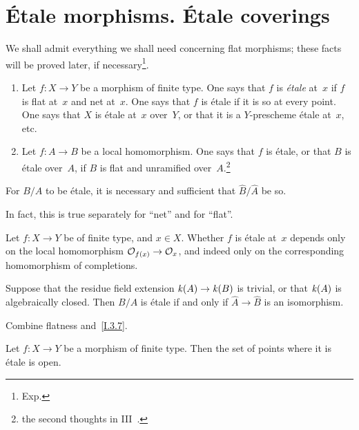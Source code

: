 \section{\'Etale morphisms. \'Etale coverings}
\label{I.4}

We shall admit everything we shall need concerning flat morphisms;
these facts will be proved later, if necessary\footnote{\Cf
Exp\ptbl{}.}.

\begin{definition}
\label{I.4.1}
\begin{enumerate}
\item[a)] Let $f\colon X\to Y$ be a morphism of finite type.
One says that $f$ is \emph{\'etale} at~$x$ if $f$ is flat at~$x$
and net at~$x$. One says that $f$ is \'etale if it is so at every
point. One says that $X$ is \'etale at~$x$ over~$Y$, or that it
is a $Y$-prescheme \'etale at~$x$, etc.
\item[b)] Let $f\colon A\to B$ be a local homomorphism. One says
that $f$ is \'etale, or that $B$ is \'etale over~$A$, if $B$ is
flat and unramified over~$A$.\footnote{\Cf the second thoughts in
III~.}
\end{enumerate}
\end{definition}

\begin{proposition}
\label{I.4.2}
For $B/A$ to be \'etale, it is necessary and sufficient that
$\widehat{B}/\widehat{A}$ be so.
\end{proposition}

In
fact, this is true separately for ``net'' and for ``flat''.

\begin{corollary}
\label{I.4.3}
Let $f\colon X\to Y$ be of finite type, and $x\in X$. Whether
$f$ is \'etale at~$x$ depends only on the local homomorphism
$\cal{O}_{f(x)}\to\cal{O}_x$, and indeed only on the corresponding
homomorphism of completions.
\end{corollary}

\begin{corollary}
\label{I.4.4}
Suppose that the residue field extension $\kres(A)\to\kres(B)$
is trivial, or that $\mathit{k}(A)$ is algebraically closed. Then
$B/A$ is \'etale if and only if $\widehat{A}\to\widehat{B}$
is an isomorphism.
\end{corollary}

Combine flatness and~\ref{I.3.7}.

\begin{proposition}
\label{I.4.5}
Let $f\colon X\to Y$ be a morphism of finite type. Then the set
of points where it is \'etale is open.
\end{proposition}

